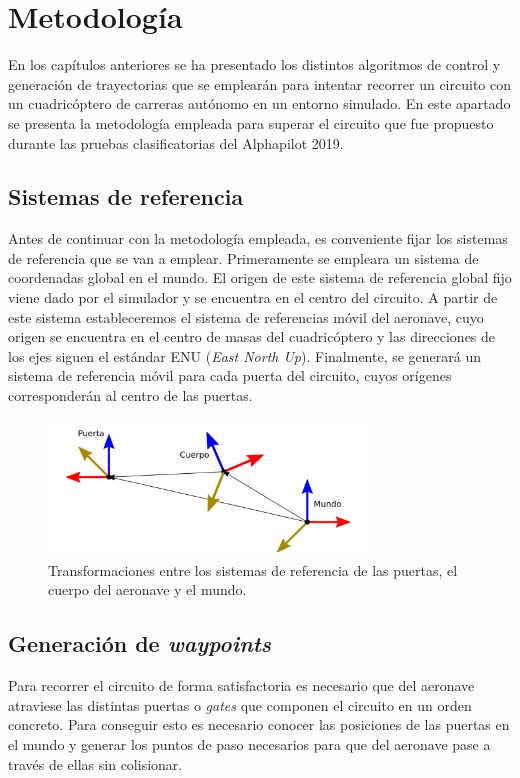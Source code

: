 \chapter{Metodología}
	
En los capítulos anteriores se ha presentado los distintos algoritmos de control y generación de trayectorias que se emplearán para intentar recorrer un circuito con un cuadricóptero de carreras autónomo en un entorno simulado. En este apartado se presenta la metodología empleada para superar el circuito que fue propuesto durante las pruebas clasificatorias del Alphapilot 2019.

\section{Sistemas de referencia}
Antes de continuar con la metodología empleada, es conveniente fijar los sistemas de referencia que se van a emplear. Primeramente se empleara un sistema de coordenadas global en el mundo. El origen de este sistema de referencia global fijo viene dado por el simulador y se encuentra en el centro del circuito. A partir de este sistema estableceremos el sistema de referencias móvil del aeronave, cuyo origen se encuentra en el centro de masas del cuadricóptero y las direcciones de los ejes siguen el estándar ENU (\textit{East North Up}). Finalmente, se generará un sistema de referencia móvil para cada puerta del circuito, cuyos orígenes corresponderán al centro de las puertas. 

\begin{figure}[htb!]
	\centering
	\includegraphics[width=0.75\textwidth]{imagenes/frames}
	\caption{Transformaciones entre los sistemas de referencia de las puertas, el cuerpo del aeronave y el mundo.}
	\label{waypoints:Refs}
\end{figure}



\section{Generación de \textit{waypoints}}
\label{section:gen_traj}
Para recorrer el circuito de forma satisfactoria es necesario que del aeronave atraviese las distintas puertas o \textit{gates} que componen el circuito en un orden concreto. Para conseguir esto es necesario conocer las posiciones de las puertas en el mundo y generar los puntos de paso necesarios para que del aeronave pase a través de ellas sin colisionar.

